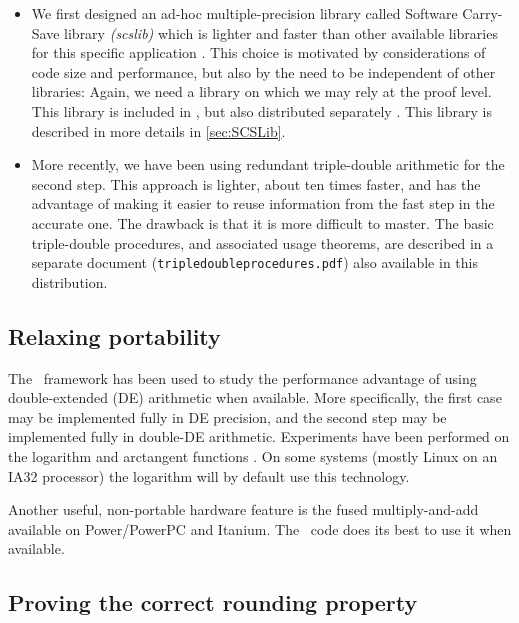\begin{itemize}
\item We first designed an ad-hoc multiple-precision library called Software
  Carry-Save library \emph{(scslib)} which is lighter and faster than
  other available libraries for this specific application
  \cite{DefDin2002,DinDef2003}. This choice is motivated by
  considerations of code size and performance, but also by the need to
  be independent of other libraries: Again, we need a library on which
  we may rely at the proof level. This library is included in \crlibm,
  but also distributed separately \cite{SCSweb}. This library is
  described in more details in \ref{sec:SCSLib}.
\item More recently, we have been using redundant triple-double
  arithmetic for the second step. This approach is lighter, about ten
  times faster, and has the advantage of making it easier to reuse
  information from the fast step in the accurate one. The drawback is
  that it is more difficult to master. The basic triple-double
  procedures, and associated usage theorems, are described in a
  separate document (\texttt{tripledoubleprocedures.pdf}) also
  available in this distribution.
\end{itemize}


\subsection{Relaxing portability}

The \crlibm\ framework has been used to study the performance
advantage of using double-extended (DE) arithmetic when available.
More specifically, the first case may be implemented fully in DE
precision, and the second step may be implemented fully in double-DE
arithmetic. Experiments have been performed on the logarithm and
arctangent functions \cite{DinErshGast2005}. On some systems (mostly
Linux on an IA32 processor) the logarithm will by default use this
technology.

Another useful, non-portable hardware feature is the fused
multiply-and-add available on Power/PowerPC and Itanium. The \crlibm\
code does its best to use it when available.


\subsection{Proving the correct rounding property}


